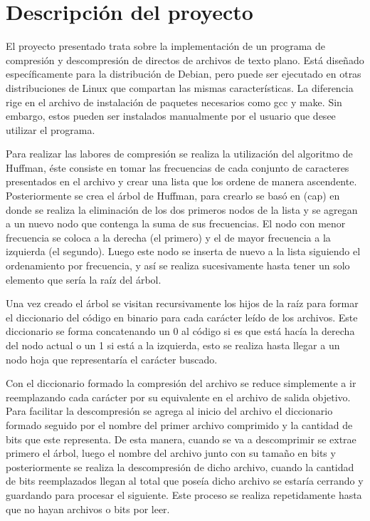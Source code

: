 \documentclass{report}
\begin{document}
\section{Descripción del proyecto}
El proyecto presentado trata sobre la implementación de un programa de compresión y descompresión de directos de archivos de texto plano. Está diseñado específicamente para la distribución de Debian, pero puede ser ejecutado en otras distribuciones de Linux que compartan las mismas características. La diferencia rige en el archivo de instalación de paquetes necesarios como gcc y make. Sin embargo, estos pueden ser instalados manualmente por el usuario que desee utilizar el programa.

Para realizar las labores de compresión se realiza la utilización del algoritmo de Huffman, éste consiste en tomar las frecuencias de cada conjunto de caracteres presentados en el archivo y crear una lista que los ordene de manera ascendente. Posteriormente se crea el árbol de Huffman, para crearlo se basó en (cap) en donde se realiza la eliminación de los dos primeros nodos de la lista y se agregan a un nuevo nodo que contenga la suma de sus frecuencias. El nodo con menor frecuencia se coloca a la derecha (el primero) y el de mayor frecuencia a la izquierda (el segundo). Luego este nodo se inserta de nuevo a la lista siguiendo el ordenamiento por frecuencia, y así se realiza sucesivamente hasta tener un solo elemento que sería la raíz del árbol.

Una vez creado el árbol se visitan recursivamente los hijos de la raíz para formar el diccionario del código en binario para cada carácter leído de los archivos. Este diccionario se forma concatenando un 0 al código si es que está hacía la derecha del nodo actual o un 1 si está a la izquierda, esto se realiza hasta llegar a un nodo hoja que representaría el carácter buscado.

Con el diccionario formado la compresión del archivo se reduce simplemente a ir reemplazando cada carácter por su equivalente en el archivo de salida objetivo. Para facilitar la descompresión se agrega al inicio del archivo el diccionario formado seguido por el nombre del primer archivo comprimido y la cantidad de bits que este representa. De esta manera, cuando se va a descomprimir se extrae primero el árbol, luego el nombre del archivo junto con su tamaño en bits y posteriormente se realiza la descompresión de dicho archivo, cuando la cantidad de bits reemplazados llegan al total que poseía dicho archivo se estaría cerrando y guardando para procesar el siguiente. Este proceso se realiza repetidamente hasta que no hayan archivos o bits por leer.
\end{document}
